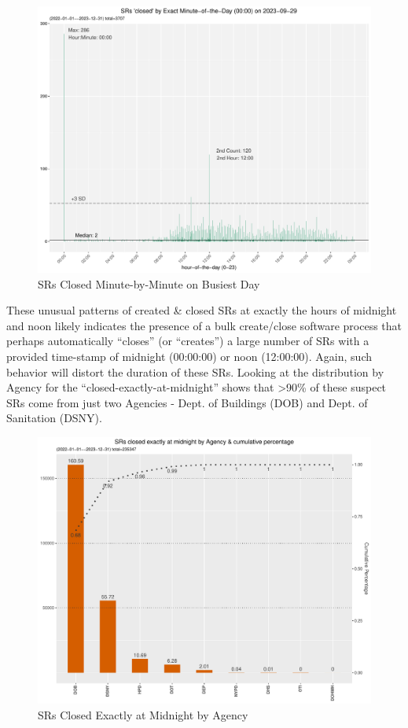 \documentclass[12pt, titlepage]{article}
\begin{document}
\begin{figure}[tbp]
	\centering
	\includegraphics[width=\textwidth]
	{2-year-trend-SR_closed_by_minute_of_busiest_day.pdf}
	\caption{SRs Closed Minute-by-Minute on Busiest Day}
	\label{fig:busiestclosed}
\end{figure}	

These unusual patterns of created \& closed SRs at exactly the hours 
of midnight and noon likely indicates the presence of a bulk create/close 
software process that perhaps automatically ``closes'' 
(or ``creates'') a large number of SRs with a provided time-stamp of 
midnight (00:00:00) or noon (12:00:00). Again, such behavior will
distort the duration of these SRs. Looking at the distribution 
by Agency for the ``closed-exactly-at-midnight'' 
shows that \textgreater90\% of these suspect SRs come from just two 
Agencies - Dept. of Buildings (DOB) and Dept. of Sanitation (DSNY). 
	
\begin{figure}[tbp]
	\centering
	\includegraphics[width = \textwidth]{closed_at_midnight_chart.pdf}
	\caption{SRs Closed Exactly at Midnight by Agency}
	\label{fig:midnight-closed}
\end{figure}	
\end{document}
